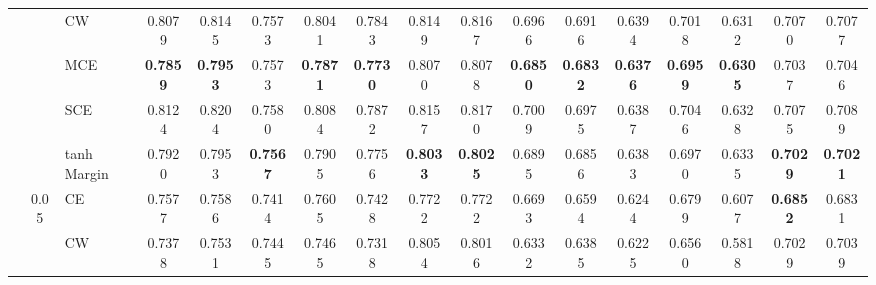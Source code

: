 \documentclass[sigconf,authordraft]{acmart}
\begin{document}
\begin{table*}
{\begin{tabular}{lcl|ccccccc|ccccccc}
                                 &      & CW &                  0.8079 &                  0.8145 &              0.7573 &                  0.8041 &           0.7843 &                       0.8149 &                       0.8167 &                  0.6966 &                  0.6916 &              0.6394 &                  0.7018 &           0.6312 &                       0.7070 &                       0.7077 \\
                                 &      & MCE &         \textbf{0.7859} &         \textbf{0.7953} &              0.7573 &         \textbf{0.7871} &  \textbf{0.7730} &                       0.8070 &                       0.8078 &         \textbf{0.6850} &         \textbf{0.6832} &     \textbf{0.6376} &         \textbf{0.6959} &  \textbf{0.6305} &                       0.7037 &                       0.7046 \\
                                 &      & SCE &                  0.8124 &                  0.8204 &              0.7580 &                  0.8084 &           0.7872 &                       0.8157 &                       0.8170 &                  0.7009 &                  0.6975 &              0.6387 &                  0.7046 &           0.6328 &                       0.7075 &                       0.7089 \\
                                 &      & tanh Margin &                  0.7920 &                  0.7953 &     \textbf{0.7567} &                  0.7905 &           0.7756 &              \textbf{0.8033} &              \textbf{0.8025} &                  0.6895 &                  0.6856 &              0.6383 &                  0.6970 &           0.6335 &              \textbf{0.7029} &              \textbf{0.7021} \\
    \cline{2-17}
                                 & \multirow{5}{*}{0.05} & CE &                  0.7577 &                  0.7586 &              0.7414 &                  0.7605 &           0.7428 &                       0.7722 &                       0.7722 &                  0.6693 &                  0.6594 &              0.6244 &                  0.6799 &           0.6077 &              \textbf{0.6852} &                       0.6831 \\
                                 &      & CW &                  0.7378 &                  0.7531 &              0.7445 &                  0.7465 &           0.7318 &                       0.8054 &                       0.8016 &                  0.6332 &                  0.6385 &              0.6225 &                  0.6560 &           0.5818 &                       0.7029 &                       0.7039 \\

\end{tabular}}
\end{table*}
\end{document}
